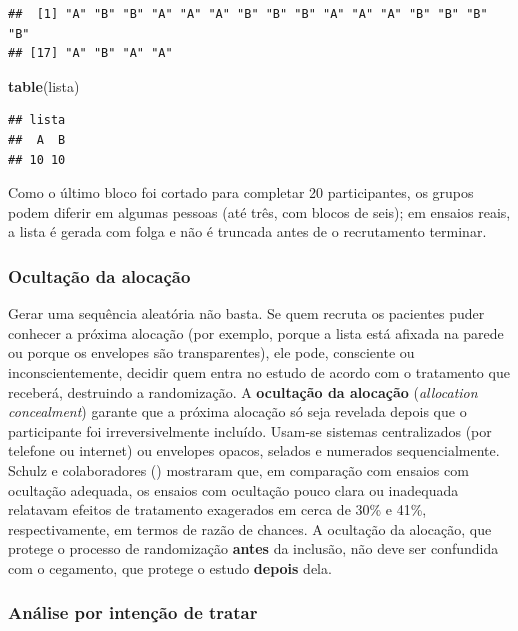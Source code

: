 \documentclass[
]{book}
\newenvironment{Shaded}{\begin{snugshade}}{\end{snugshade}}
\newcommand{\FunctionTok}[1]{\textcolor[rgb]{0.13,0.29,0.53}{\textbf{#1}}}
\newcommand{\NormalTok}[1]{#1}
\begin{document}
\begin{verbatim}
##  [1] "A" "B" "B" "A" "A" "A" "B" "B" "B" "A" "A" "A" "B" "B" "B" "B"
## [17] "A" "B" "A" "A"
\end{verbatim}

\begin{Shaded}
\begin{Highlighting}[]
\FunctionTok{table}\NormalTok{(lista)}
\end{Highlighting}
\end{Shaded}

\begin{verbatim}
## lista
##  A  B 
## 10 10
\end{verbatim}

Como o último bloco foi cortado para completar 20 participantes, os grupos podem diferir em algumas pessoas (até três, com blocos de seis); em ensaios reais, a lista é gerada com folga e não é truncada antes de o recrutamento terminar.

\subsubsection{Ocultação da alocação}\label{ocultauxe7uxe3o-da-alocauxe7uxe3o}

Gerar uma sequência aleatória não basta. Se quem recruta os pacientes puder conhecer a próxima alocação (por exemplo, porque a lista está afixada na parede ou porque os envelopes são transparentes), ele pode, consciente ou inconscientemente, decidir quem entra no estudo de acordo com o tratamento que receberá, destruindo a randomização. A \textbf{ocultação da alocação} (\emph{allocation concealment}) garante que a próxima alocação só seja revelada depois que o participante foi irreversivelmente incluído. Usam-se sistemas centralizados (por telefone ou internet) ou envelopes opacos, selados e numerados sequencialmente. Schulz e colaboradores () mostraram que, em comparação com ensaios com ocultação adequada, os ensaios com ocultação pouco clara ou inadequada relatavam efeitos de tratamento exagerados em cerca de 30\% e 41\%, respectivamente, em termos de razão de chances. A ocultação da alocação, que protege o processo de randomização \textbf{antes} da inclusão, não deve ser confundida com o cegamento, que protege o estudo \textbf{depois} dela.

\subsubsection{Análise por intenção de tratar}\label{anuxe1lise-por-intenuxe7uxe3o-de-tratar}
\end{document}
